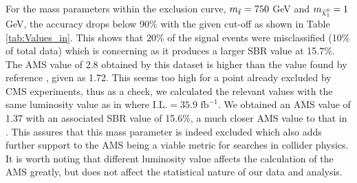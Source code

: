 \indent For the mass parameters within the exclusion curve, $m_{\Tilde{t}} = 750$ GeV and $m_{\Tilde{\chi}_1^0} = 1$ GeV, the accuracy drops below 90\% with the given cut-off as shown in Table \ref{tab:Values_in}. This shows that 20\% of the signal events were misclassified (10\% of total data) which is concerning as it produces a larger SBR value at 15.7\%. The AMS value of 2.8 obtained by this dataset is higher than the value found by reference \cite{roxlo2018opening}, given as 1.72. This seems too high for a point already excluded by CMS experiments, thus as a check, we calculated the relevant values with the same luminosity value as in \cite{roxlo2018opening} where $\text{I.L.}=35.9\text{ fb}^{-1}$. We obtained an AMS value of 1.37 with an associated SBR value of 15.6\%, a much closer AMS value to that in \cite{roxlo2018opening}. This assures that this mass parameter is indeed excluded which also adds further support to the AMS being a viable metric for searches in collider physics. It is worth noting that different luminosity value affects the calculation of the AMS greatly, but does not affect the statistical nature of our data and analysis. \\

